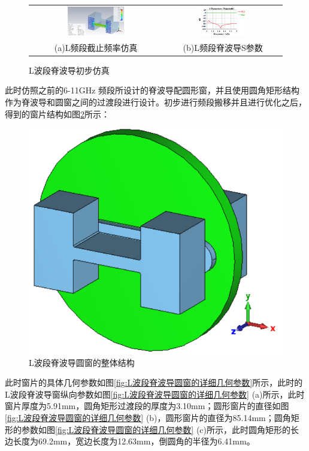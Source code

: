 \documentclass[master]{thesis-uestc}
\begin{document}
\begin{figure}[!htb]
    \small
    \centering
    \begin{tabular}{@{\ }c@{\ }c}
        \includegraphics[width=0.45\textwidth]{pic/chapter4/脊波导截止频率仿真.png} & 
        \hspace{5pt}
        \includegraphics[width=0.45\textwidth]{pic/chapter4/L波段脊波导S参数.png}     \\
        \mbox{\small (a)L频段截止频率仿真}                                                                               & 
        \mbox{\small (b)L频段脊波导S参数}                                                                                  \\
    \end{tabular}
    \caption{L波段脊波导初步仿真}
    \label{fig:L波段脊波导初步仿真}
\end{figure}



此时仿照之前的6-11GHz 频段所设计的脊波导配圆形窗，并且使用圆角矩形结构作为脊波导和圆窗之间的过渡段进行设计。初步进行频段搬移并且进行优化之后，得到的窗片结构如图\ref{fig:L波段脊波导圆窗的整体结构}所示：
\begin{figure}[!htb]
    \centering
    \includegraphics[width=0.25\linewidth]{pic/chapter4/L波段脊波导圆窗的整体结构.png}
    \caption{L波段脊波导圆窗的整体结构}
    \label{fig:L波段脊波导圆窗的整体结构}
\end{figure}

此时窗片的具体几何参数如图\ref{fig:L波段脊波导圆窗的详细几何参数}所示，此时的L波段脊波导窗纵向参数如图\ref{fig:L波段脊波导圆窗的详细几何参数} (a)所示，此时窗片厚度为5.91mm，圆角矩形过渡段的厚度为3.10mm；圆形窗片的直径如图\ref{fig:L波段脊波导圆窗的详细几何参数} (b)，圆形窗片的直径为85.14mm；圆角矩形的参数如图\ref{fig:L波段脊波导圆窗的详细几何参数} (c)所示，此时圆角矩形的长边长度为69.2mm，宽边长度为12.63mm，倒圆角的半径为6.41mm。
\end{document}
